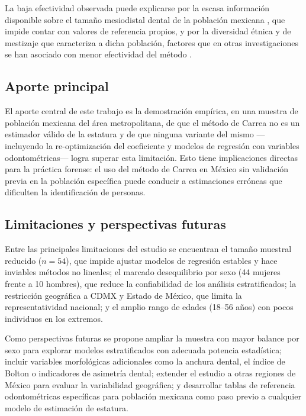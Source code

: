 \documentclass[11pt,letterpaper]{article}
\begin{document}
La baja efectividad observada puede explicarse por la escasa información disponible sobre el tamaño mesiodistal dental de la población mexicana \cite{Gonzalez2015, Rojo2014}, que impide contar con valores de referencia propios, y por la diversidad étnica y de mestizaje que caracteriza a dicha población, factores que en otras investigaciones se han asociado con menor efectividad del método \cite{Brito2022}.

\subsection*{Aporte principal}

El aporte central de este trabajo es la demostración empírica, en una muestra de población mexicana del área metropolitana, de que el método de Carrea no es un estimador válido de la estatura y de que ninguna variante del mismo —incluyendo la re-optimización del coeficiente y modelos de regresión con variables odontométricas— logra superar esta limitación. Esto tiene implicaciones directas para la práctica forense: el uso del método de Carrea en México sin validación previa en la población específica puede conducir a estimaciones erróneas que dificulten la identificación de personas.

\subsection*{Limitaciones y perspectivas futuras}

Entre las principales limitaciones del estudio se encuentran el tamaño muestral reducido ($n = 54$), que impide ajustar modelos de regresión estables y hace inviables métodos no lineales; el marcado desequilibrio por sexo (44 mujeres frente a 10 hombres), que reduce la confiabilidad de los análisis estratificados; la restricción geográfica a CDMX y Estado de México, que limita la representatividad nacional; y el amplio rango de edades (18--56 años) con pocos individuos en los extremos.

Como perspectivas futuras se propone ampliar la muestra con mayor balance por sexo para explorar modelos estratificados con adecuada potencia estadística; incluir variables morfológicas adicionales como la anchura dental, el índice de Bolton o indicadores de asimetría dental; extender el estudio a otras regiones de México para evaluar la variabilidad geográfica; y desarrollar tablas de referencia odontométricas específicas para población mexicana como paso previo a cualquier modelo de estimación de estatura.
\end{document}
